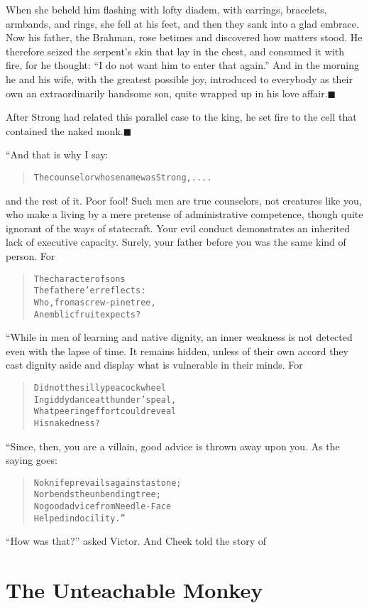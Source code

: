 \documentclass[article, twoside, 14pt]{memoir}
\newcommand{\qed}{\hfill \ensuremath{\blacksquare}}
\renewenvironment{verbatim}{%
\begin{quote}%
\vskip -10pt%
\begin{alltt}\normalfont\large}{\end{alltt}%
\end{quote}%
\vskip -10pt
} %
\begin{document}
When she beheld him flashing with lofty diadem, with earrings,
bracelets, armbands, and rings, she fell at his feet, and then they
sank into a glad embrace. Now his father, the Brahman, rose betimes
and discovered how matters stood. He therefore seized the serpent's
skin that lay in the chest, and consumed it with fire, for he
thought: ``I do not want him to enter that again.'' And in the
morning he and his wife, with the greatest possible joy, introduced
to everybody as their own an extraordinarily handsome son, quite
wrapped up in his love affair.\hyperref[s26]{\qed}

After Strong had related this parallel case to the king, he set
fire to the cell that contained the naked
monk.\hyperref[s25]{\qed}

“And that is why I say:

\begin{verbatim}
The counselor whose name was Strong, ....
\end{verbatim}
and the rest of it. Poor fool! Such men are true counselors, not
creatures like you, who make a living by a mere pretense of
administrative competence, though quite ignorant of the ways of
statecraft. Your evil conduct demonstrates an inherited lack of
executive capacity. Surely, your father before you was the same
kind of person. For

\begin{verbatim}
The character of sons
    The father e'er reflects:
Who, from a screw-pine tree,
    An emblic fruit expects?
\end{verbatim}
“While in men of learning and native dignity, an inner weakness is
not detected even with the lapse of time. It remains hidden, unless
of their own accord they cast dignity aside and display what is
vulnerable in their minds. For

\begin{verbatim}
Did not the silly peacock wheel
In giddy dance at thunder's peal,
What peering effort could reveal
    His nakedness?
\end{verbatim}
“Since, then, you are a villain, good advice is thrown away
upon you. As the saying goes:

\begin{verbatim}
No knife prevails against a stone;
    Nor bends the unbending tree;
No good advice from Needle-Face
    Helped indocility.”
\end{verbatim}
``How was that?'' asked Victor. And Cheek told the story of

\chapter{The Unteachable Monkey}
\end{document}

